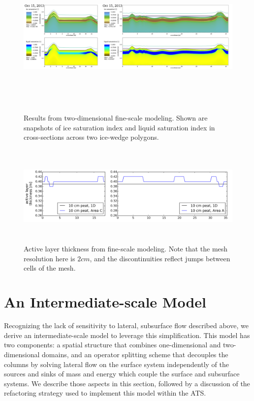 \documentclass[review,11pt]{elsarticle}
\begin{document}
\begin{figure}
\centering
\includegraphics[height=8cm,width=17cm]{figures/FineScaleOct15.png}
\caption{Results from two-dimensional fine-scale modeling. Shown are snapshots of ice saturation index and liquid saturation index in cross-sections across two ice-wedge polygons.}
\label{oct15}
\end{figure}

\begin{figure}[!htpb]
\centering
\includegraphics[height=5cm, width=12cm]{figures/ALT-finescale.png}
\caption{Active layer thickness from fine-scale modeling.  Note that the mesh resolution here is $2 cm$, and the discontinuities reflect jumps between cells of the mesh.}
\label{alt}
\end{figure}


\section{An Intermediate-scale Model}\label{mixed-dim-model}
Recognizing the lack of sensitivity to lateral, subsurface flow described above, we derive an intermediate-scale model to leverage this simplification.
This model has two components: a spatial structure that combines one-dimensional and two-dimensional domains, and an operator splitting scheme that decouples the columns by solving lateral flow on the surface system independently of the sources and sinks of mass and energy which couple the surface and subsurface systems.
We describe those aspects in this section, followed by a discussion of the refactoring strategy used to implement this model within the ATS.
\end{document}
